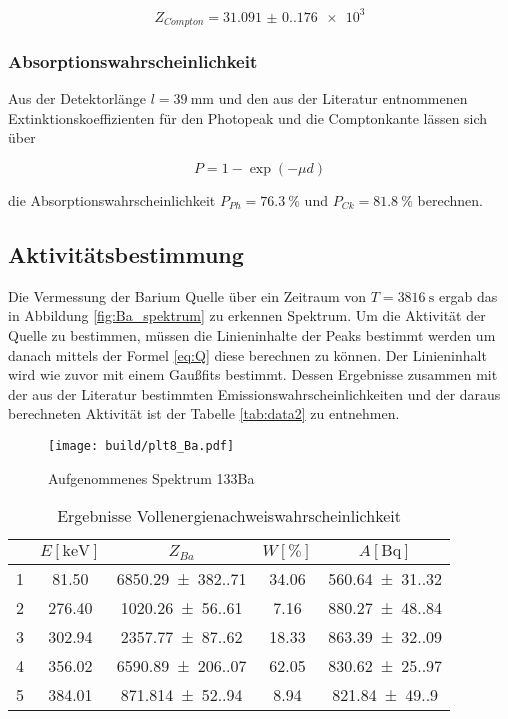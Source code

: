 \begin{equation*}
	Z_{Compton}=\num{31.091(0.176)e3}
\end{equation*}

\subsubsection{Absorptionswahrscheinlichkeit}
Aus der Detektorlänge $l=\qty{39}{\milli\meter}$ und den aus der Literatur \cite{web:nist} entnommenen Extinktionskoeffizienten für den Photopeak und die Comptonkante lässen sich über 

\begin{equation}
	P=1-\exp(-\mu d)
\end{equation}

die Absorptionswahrscheinlichkeit $P_{Ph}=\qty{76.3}{\%}$ und $P_{Ck}=\qty{81.8}{\%}$ berechnen.

\subsection{Aktivitätsbestimmung}
Die Vermessung der Barium Quelle über ein Zeitraum von $T=\qty{3816}{\second}$ ergab das in Abbildung \eqref{fig:Ba_spektrum} zu erkennen Spektrum. 
Um die Aktivität der Quelle zu bestimmen, müssen die Linieninhalte der Peaks bestimmt werden um danach mittels der Formel \eqref{eq:Q} diese berechnen zu können. 
Der Linieninhalt wird wie zuvor mit einem Gaußfits bestimmt. 
Dessen Ergebnisse zusammen mit der aus der Literatur \cite{web:nuclear} bestimmten Emissionswahrscheinlichkeiten und 
der daraus berechneten Aktivität ist der Tabelle \eqref{tab:data2} zu entnehmen. 

\begin{figure}[H]
	\centering
	\texttt{[image: build/plt8\_Ba.pdf]}
	\caption{Aufgenommenes Spektrum 133Ba}
	\label{fig:Ba_spektrum}
\end{figure}

\begin{table}[H]
	\centering
	\caption{Ergebnisse Vollenergienachweiswahrscheinlichkeit}
	\begin{tabular}{c c c c c}
		\toprule
		\text{Peak} & $ E [\unit{\kilo\eV}] $ & $ Z_{Ba} $               & $ W [\%] $ & $ A [\unit{\becquerel}] $         \\
		\midrule
		1           & \num{81.50}   &  \num{6850.29(382.71)}  & \num{34.06} & \num{560.64(31.32)} \\
		2           & \num{276.40}  &  \num{1020.26(56.61)}   & \num{7.16}  & \num{880.27(48.84)} \\
		3           & \num{302.94}  &  \num{2357.77(87.62)}   & \num{18.33} & \num{863.39(32.09)} \\
		4           & \num{356.02}  &  \num{6590.89(206.07)}  & \num{62.05} & \num{830.62(25.97)} \\
		5           & \num{384.01}  &  \num{871.814(52.94)}   & \num{8.94}  & \num{821.84(49.90)} \\
		\bottomrule
	\end{tabular}
	\label{tab:data2}
\end{table}

